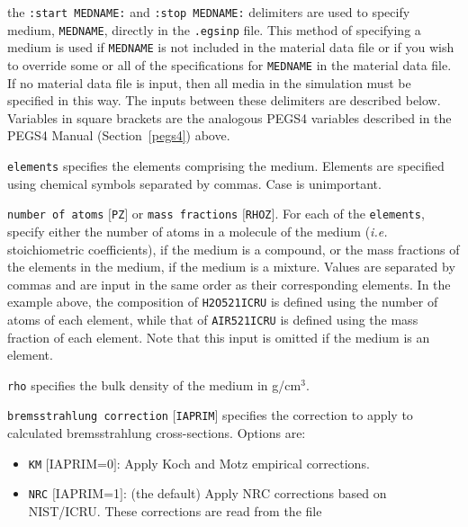 \begin{description}
\item the {\tt :start MEDNAME:} and {\tt :stop MEDNAME:} delimiters are used to specify medium, {\tt MEDNAME}, directly in the
{\tt .egsinp} file.  This method of specifying a medium is used if {\tt MEDNAME} is not included in the material data file or
if you wish to override some or all of the specifications for {\tt MEDNAME} in the material data file.
If no material data file is input, then all media in the simulation
must be specified in this way.  The inputs between these delimiters are described below.  Variables
in square brackets are the analogous PEGS4 variables described in the PEGS4 Manual (Section~\ref{pegs4}) above.
\begin{description}
\item {\tt elements} specifies the elements comprising the medium.  Elements are specified using chemical symbols separated by
commas.  Case is unimportant.
\item {\tt number of atoms} $[${\tt PZ}$]$ or {\tt mass fractions} $[${\tt RHOZ}$]$.  For each of the {\tt elements}, specify either the number of atoms in a molecule of the medium ({\it i.e.} stoichiometric coefficients), if the
medium is a compound, or the mass fractions of the elements in the medium,
if the medium is a mixture.
Values are separated by commas and are input in the same order as their corresponding elements.  In the example above,
the composition of {\tt H2O521ICRU} is
defined using the number of atoms of each element, while that of {\tt AIR521ICRU} is defined using the mass fraction of each element.  Note that this input
is omitted if the medium is an element.
\item {\tt rho} specifies the bulk density of the medium in g/cm$^3$.
\item {\tt bremsstrahlung correction} $[${\tt IAPRIM}$]$ specifies the
correction to apply to calculated bremsstrahlung cross-sections.
Options are:
\begin{itemize}
\item {\tt KM} $[$IAPRIM=0$]$: Apply Koch and Motz\cite{KM59} empirical corrections.
\item {\tt NRC} $[$IAPRIM=1$]$: (the default) Apply NRC corrections based on NIST/ICRU\cite{Ro89a}.  These corrections are read from the file

\end{itemize}
\end{description}
\end{description}
